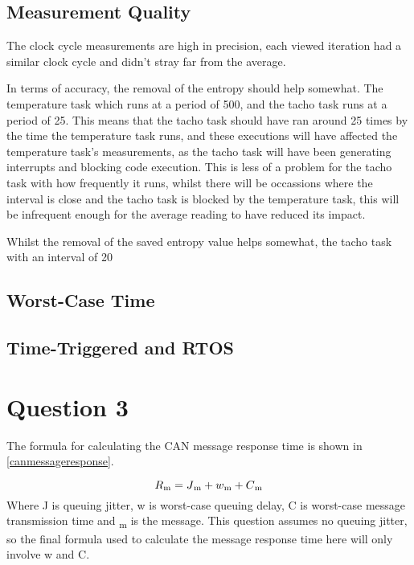 \documentclass[]{report}
\begin{document}
			\subsection{Measurement Quality}
			The clock cycle measurements are high in precision, each viewed iteration had a similar clock cycle and didn't stray far from the average.
			
			In terms of accuracy, the removal of the entropy should help somewhat. The temperature task which runs at a period of 500, and the tacho task runs at a period of 25. This means that the tacho task should have ran around 25 times by the time the temperature task runs, and these executions will have affected the temperature task's measurements, as the tacho task will have been generating interrupts and blocking code execution. This is less of a problem for the tacho task with how frequently it runs, whilst there will be occassions where the interval is close and the tacho task is blocked by the temperature task, this will be infrequent enough for the average reading to have reduced its impact. 
			
			Whilst the removal of the saved entropy value helps somewhat, the tacho task with an interval of 20
			
			
			
			\subsection{Worst-Case Time}
			\subsection{Time-Triggered and RTOS}
		
		
		\section{Question 3}
		The formula for calculating the CAN message response time is shown in \ref{canmessageresponse}.
		
		\begin{equation}
		\label{canmessageresponse}
		R\textsubscript{m} = J\textsubscript{m} + w\textsubscript{m} + C\textsubscript{m}
		\end{equation}
		Where J is queuing jitter, w is worst-case queuing delay, C is worst-case message transmission time and \textsubscript{m} is the message. This question assumes no queuing jitter, so the final formula used to calculate the message response time here will only involve w and C.
		\medskip
		
\end{document}
